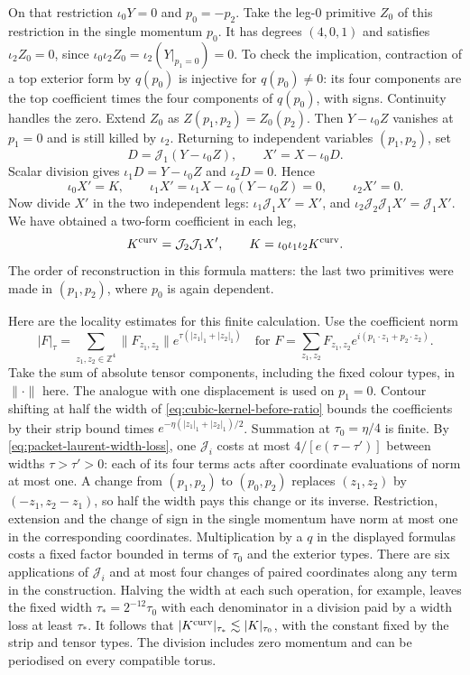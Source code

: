 \documentclass[11pt,reqno]{amsart}
\numberwithin{equation}{section}
\theoremstyle{definition}
\theoremstyle{remark}
\newcommand{\Z}{\mathbb Z}
\begin{document}
On that restriction \(\iota_0Y=0\) and \(p_0=-p_2\).
Take the leg-\(0\) primitive \(Z_0\) of this restriction
in the single momentum \(p_0\). It has degrees \((4,0,1)\)
and satisfies \(\iota_2Z_0=0\), since
\(\iota_0\iota_2Z_0=\iota_2(Y|_{p_1=0})=0\).
To check the implication, contraction of a top exterior
form by \(q(p_0)\) is injective for \(q(p_0)\ne0\):
its four components are the top coefficient times the
four components of \(q(p_0)\), with signs. Continuity
handles the zero. Extend \(Z_0\) as \(Z(p_1,p_2)=Z_0(p_2)\).
Then \(Y-\iota_0 Z\) vanishes at \(p_1=0\) and
is still killed by \(\iota_2\). Returning to independent
variables \((p_1,p_2)\), set
\[
 D=\mathcal J_1(Y-\iota_0Z),\qquad
 X'=X-\iota_0D .
\]
Scalar division gives \(\iota_1D=Y-\iota_0Z\) and
\(\iota_2D=0\). Hence
\[
 \iota_0X'=K,\qquad
 \iota_1X'=\iota_1X-\iota_0(Y-\iota_0Z)=0,\qquad
 \iota_2X'=0 .
\]
Now divide \(X'\) in the two independent legs:
\(\iota_1\mathcal J_1X'=X'\), and
\(\iota_2\mathcal J_2\mathcal J_1 X'=\mathcal J_1X'\).
We have obtained a two-form coefficient in each leg,
\begin{equation}
          K^{\rm curv}=\mathcal J_2\mathcal J_1 X',
          \qquad K=\iota_0\iota_1\iota_2 K^{\rm curv}.
 \label{eq:cubic-three-curls}
\end{equation}
The order of reconstruction in this formula matters:
the last two primitives were made in \((p_1,p_2)\),
where \(p_0\) is again dependent.

Here are the locality estimates for this finite
calculation. Use the coefficient norm
\[
 |F|_\tau=\sum_{z_1,z_2\in\Z^4}
          \|F_{z_1,z_2}\|e^{\tau(|z_1|_1+|z_2|_1)}
 \quad\text{for }F=\sum_{z_1,z_2}F_{z_1,z_2}
                             e^{i(p_1\cdot z_1+p_2\cdot z_2)}.
\]
Take the sum of absolute tensor components, including
the fixed colour types, in \(\|\cdot\|\) here. The
analogue with one displacement is used on \(p_1=0\).
Contour shifting at half the width of
\eqref{eq:cubic-kernel-before-ratio} bounds the
coefficients by their strip bound times
\(e^{-\eta(|z_1|_1+|z_2|_1)/2}\). Summation at
\(\tau_0=\eta/4\) is finite. By
\eqref{eq:packet-laurent-width-loss}, one \(\mathcal J_i\)
costs at most \(4/[e(\tau-\tau')]\) between widths
\(\tau>\tau'>0\): each of its four terms acts after
coordinate evaluations of norm at most one. A change
from \((p_1,p_2)\) to \((p_0,p_2)\) replaces
\((z_1,z_2)\) by \((-z_1,z_2-z_1)\), so half the width
pays this change or its inverse. Restriction, extension
and the change of sign in the single momentum have
norm at most one in the corresponding coordinates.
Multiplication by a \(q\) in the displayed formulas
costs a fixed factor bounded in terms of \(\tau_0\)
and the exterior types. There are six applications of
\(\mathcal J_i\) and at most four changes of paired
coordinates along any term in the construction.
Halving the width at each such operation, for example,
leaves the fixed width \(\tau_* = 2^{-12}\tau_0\)
with each denominator in a division paid by a width
loss at least \(\tau_*\). It follows that
\(|K^{\rm curv}|_{\tau_*}\lesssim |K|_{\tau_0}\),
with the constant fixed by the strip and tensor types.
The division includes zero momentum and can be
periodised on every compatible torus.
\end{document}

